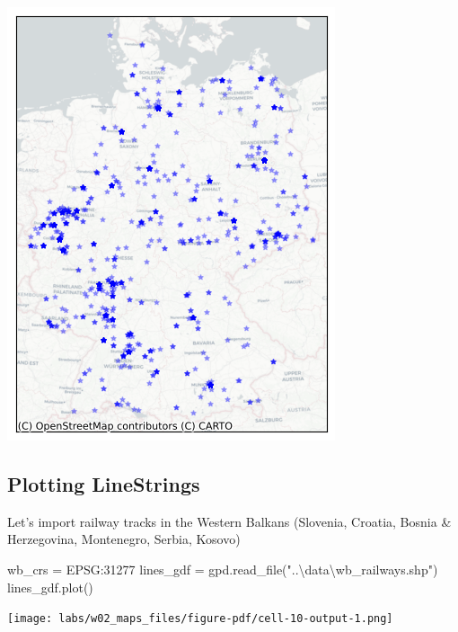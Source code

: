 \documentclass[
  letterpaper,
  DIV=11,
  numbers=noendperiod]{scrreprt}
\newenvironment{Shaded}{\begin{snugshade}}{\end{snugshade}}
\newcommand{\NormalTok}[1]{\textcolor[rgb]{0.00,0.23,0.31}{#1}}
\newcommand{\OperatorTok}[1]{\textcolor[rgb]{0.37,0.37,0.37}{#1}}
\newcommand{\StringTok}[1]{\textcolor[rgb]{0.13,0.47,0.30}{#1}}
\begin{document}
\includegraphics{labs/w02_maps_files/figure-pdf/cell-9-output-1.png}

\subsection{Plotting LineStrings}\label{plotting-linestrings}

Let's import railway tracks in the Western Balkans (Slovenia, Croatia,
Bosnia \& Herzegovina, Montenegro, Serbia, Kosovo)

\begin{Shaded}
\begin{Highlighting}[]
\NormalTok{wb\_crs }\OperatorTok{=} \StringTok{\textquotesingle{}EPSG:31277\textquotesingle{}}
\NormalTok{lines\_gdf }\OperatorTok{=}\NormalTok{ gpd.read\_file(}\StringTok{"..\textbackslash{}data\textbackslash{}wb\_railways.shp"}\NormalTok{)}
\NormalTok{lines\_gdf.plot()}
\end{Highlighting}
\end{Shaded}

\texttt{[image: labs/w02\_maps\_files/figure-pdf/cell-10-output-1.png]}
\end{document}

